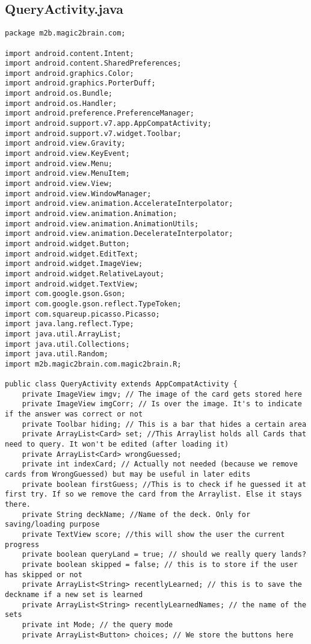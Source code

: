 \subsection{QueryActivity.java}
\begin{lstlisting}
package m2b.magic2brain.com;

import android.content.Intent;
import android.content.SharedPreferences;
import android.graphics.Color;
import android.graphics.PorterDuff;
import android.os.Bundle;
import android.os.Handler;
import android.preference.PreferenceManager;
import android.support.v7.app.AppCompatActivity;
import android.support.v7.widget.Toolbar;
import android.view.Gravity;
import android.view.KeyEvent;
import android.view.Menu;
import android.view.MenuItem;
import android.view.View;
import android.view.WindowManager;
import android.view.animation.AccelerateInterpolator;
import android.view.animation.Animation;
import android.view.animation.AnimationUtils;
import android.view.animation.DecelerateInterpolator;
import android.widget.Button;
import android.widget.EditText;
import android.widget.ImageView;
import android.widget.RelativeLayout;
import android.widget.TextView;
import com.google.gson.Gson;
import com.google.gson.reflect.TypeToken;
import com.squareup.picasso.Picasso;
import java.lang.reflect.Type;
import java.util.ArrayList;
import java.util.Collections;
import java.util.Random;
import m2b.magic2brain.com.magic2brain.R;

public class QueryActivity extends AppCompatActivity {
    private ImageView imgv; // The image of the card gets stored here
    private ImageView imgCorr; // Is over the image. It's to indicate if the answer was correct or not
    private Toolbar hiding; // This is a bar that hides a certain area
    private ArrayList<Card> set; //This Arraylist holds all Cards that need to query. It won't be edited (after loading it)
    private ArrayList<Card> wrongGuessed;
    private int indexCard; // Actually not needed (because we remove cards from WrongGuessed) but may be useful in later edits
    private boolean firstGuess; //This is to check if he guessed it at first try. If so we remove the card from the Arraylist. Else it stays there.
    private String deckName; //Name of the deck. Only for saving/loading purpose
    private TextView score; //this will show the user the current progress
    private boolean queryLand = true; // should we really query lands?
    private boolean skipped = false; // this is to store if the user has skipped or not
    private ArrayList<String> recentlyLearned; // this is to save the deckname if a new set is learned
    private ArrayList<String> recentlyLearnedNames; // the name of the sets
    private int Mode; // the query mode
    private ArrayList<Button> choices; // We store the buttons here


\end{lstlisting}
